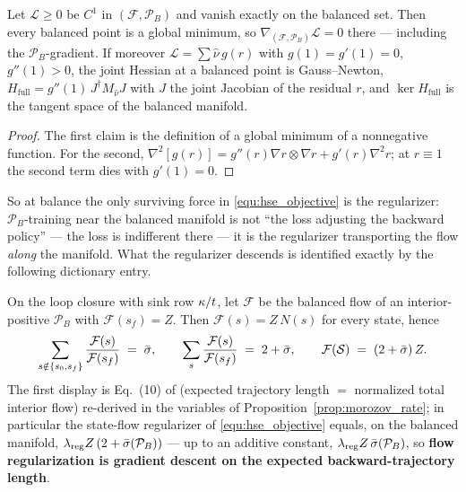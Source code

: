 \begin{lemma}\label{lem:balanced_min}
Let $\mathcal L\geq0$ be $C^1$ in $(\mathcal F,\mathcal P_B)$ and vanish exactly on the
balanced set. Then every balanced point is a global minimum, so
$\nabla_{(\mathcal F,\mathcal P_B)}\mathcal L=0$ there --- including the
$\mathcal P_B$-gradient. If moreover $\mathcal L=\sum\widehat\nu\, g(r)$ with
$g(1)=g'(1)=0$, $g''(1)>0$, the joint Hessian at a balanced point is Gauss--Newton,
$H_{\mathrm{full}} = g''(1)\, J^\dagger M_{\widehat\nu} J$ with $J$ the joint Jacobian of
the residual $r$, and $\ker H_{\mathrm{full}}$ is the tangent space of the balanced
manifold.
\end{lemma}

\begin{proof}
The first claim is the definition of a global minimum of a nonnegative function. For the
second, $\nabla^2[g(r)] = g''(r)\nabla r\otimes\nabla r + g'(r)\nabla^2 r$; at $r\equiv1$
the second term dies with $g'(1)=0$.
\end{proof}

So at balance the only surviving force in \eqref{equ:hse_objective} is the regularizer:
$\mathcal P_B$-training near the balanced manifold is not ``the loss adjusting the
backward policy'' --- the loss is indifferent there --- it is the regularizer
transporting the flow \emph{along} the manifold. What the regularizer descends is
identified exactly by the following dictionary entry.

\begin{lemma}\label{lem:eq10_occupation}
On the loop closure with sink row $\kappa/t$, let $\mathcal F$ be the balanced flow of an
interior-positive $\mathcal P_B$ with $\mathcal F(s_f)=Z$. Then $\mathcal F(s) = Z\,N(s)$
for every state, hence
\begin{equation}\label{equ:eq10}
    \sum_{s\notin\{s_0,s_f\}}\frac{\mathcal F(s)}{\mathcal F(s_f)} \;=\; \bar\sigma,
    \qquad
    \sum_{s}\frac{\mathcal F(s)}{\mathcal F(s_f)} \;=\; 2+\bar\sigma,
    \qquad
    \mathcal F(\mathcal S) \;=\; (2+\bar\sigma)\,Z .
\end{equation}
The first display is Eq.~(10) of \citet{morozov2025revisiting} (expected trajectory
length $=$ normalized total interior flow) re-derived in the variables of
Proposition~\ref{prop:morozov_rate}; in particular the state-flow regularizer of
\eqref{equ:hse_objective} equals, on the balanced manifold,
$\lambda_{\mathrm{reg}}{}Z\,(2+\bar\sigma(\mathcal P_B))$ --- up to an additive constant,
$\lambda_{\mathrm{reg}}{}Z\,\bar\sigma(\mathcal P_B)$, so \textbf{flow regularization is
gradient descent on the expected backward-trajectory length}.
\end{lemma}

